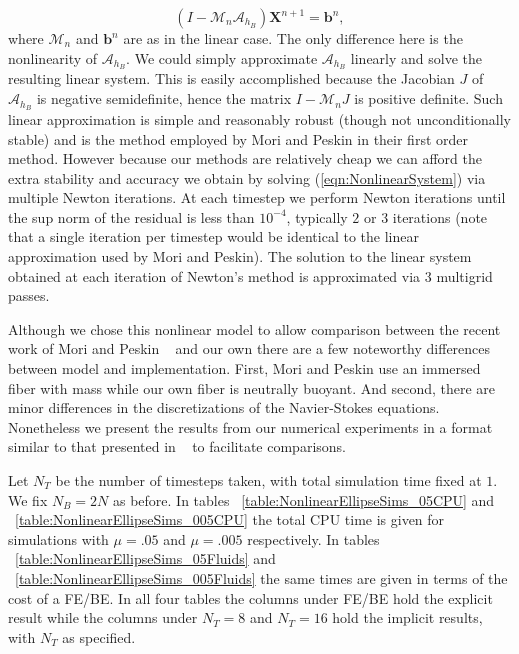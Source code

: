 \documentclass[preprint,12pt]{elsarticle}
\begin{document}
\begin{equation}
(I - \mathcal{M}_n\mathcal{A}_{h_B})\mathbf{X}^{n+1} = \mathbf{b}^n,
\label{eqn:NonlinearSystem}
\end{equation}
where $\mathcal{M}_n$ and $\mathbf{b}^n$ are as in the linear case. The only difference here is the nonlinearity of $\mathcal{A}_{h_B}$. We could simply approximate $\mathcal{A}_{h_B}$ linearly and solve the resulting linear system. This is easily accomplished because the Jacobian $J$ of $\mathcal{A}_{h_B}$ is negative semidefinite, hence the matrix $I-\mathcal{M}_nJ$ is positive definite. Such linear approximation is simple and reasonably robust (though not unconditionally stable) and is the method employed by Mori and Peskin in their first order method. However because our methods are relatively cheap we can afford the extra stability and accuracy we obtain by solving (\ref{eqn:NonlinearSystem}) via multiple Newton iterations. At each timestep we perform Newton iterations until the sup norm of the residual is less than $10^{-4}$, typically $2$ or $3$ iterations (note that a single iteration per timestep would be identical to the linear approximation used by Mori and Peskin). The solution to the linear system obtained at each iteration of Newton's method is approximated via $3$ multigrid passes.

Although we chose this nonlinear model to allow comparison between the recent work of Mori and Peskin ~\cite{MP2008} and our own there are a few noteworthy differences between model and implementation. First, Mori and Peskin use an immersed fiber with mass while our own fiber is neutrally buoyant. And second, there are minor differences in the discretizations of the Navier-Stokes equations. Nonetheless we present the results from our numerical experiments in a format similar to that presented in ~\cite{MP2008} to facilitate comparisons.

Let $N_T$ be the number of timesteps taken, with total simulation time fixed at $1$. We fix $N_B=2N$ as before. 
In tables ~\ref{table:NonlinearEllipseSims_05CPU} and ~\ref{table:NonlinearEllipseSims_005CPU} the total CPU time is given for simulations with $\mu=.05$ and $\mu=.005$ respectively. In tables ~\ref{table:NonlinearEllipseSims_05Fluids} and ~\ref{table:NonlinearEllipseSims_005Fluids} the same times are given in terms of the cost of a FE/BE. In all four tables the columns under FE/BE hold the explicit result while the columns under $N_T=8$ and $N_T=16$ hold the implicit results, with $N_T$ as specified.
\end{document}
